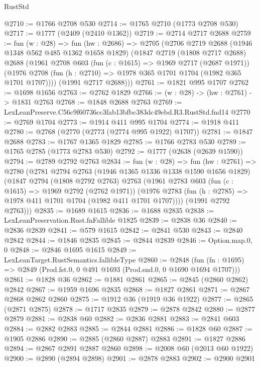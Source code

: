 \begin{lexlean}{RustStd}
\begin{coremodule}
@2710 := @1766 @2708 @530
@2714 := @1765 @2710 (@1773 @2708 @530)
@2717 := @1777 (@2409 (@2410 @1362))
@2719 := @2714 @2717 @2688
@2759 := fun (w : @28) =>
  fun (hw : @2686) =>
  @2705
    (@2706
      @2719
      @2688
      (@1946 @1348 @562 @485 @1362 @1658 @1829)
      (@1847
        @2719
        (@1808 @2717 @2688)
        @2688
        (@1961
          @2708
          @603
          (fun (c : @1615) => @1969 @2717 (@2687 @1971))
          (@1976 @2708 (fun (h : @2710) => @1978 @365 @1701 @1704 (@1982 @365 @1701 @1707))))
        (@1991 @2717 @2688)))
@2761 := @1821 @995 @1707
@2762 := @1698 @1656
@2763 := @2762 @1829
@2766 := (w : @28) -> (hw : @2761) -> @1831 @2763
@2768 := @1848 @2688 @2763
@2769 := LexLeanPreserve.C56c9f60736cc3fab13bfbc383dc49ebd.R3.RustStd.fnd14
@2770 := @2769 @1704
@2773 := @1914 @411 @995 @1704
@2774 := @1918 @411
@2780 := @2768 (@2770 (@2773 (@2774 @995 @1922) @1707))
@2781 := @1847 @2688
@2783 := @1767 @1365 @1829
@2785 := @1766 @2783 @530
@2789 := @1765 @2785 (@1773 @2783 @530)
@2792 := @1777 (@2638 (@2639 @1590))
@2794 := @2789 @2792 @2763
@2834 := fun (w : @28) =>
  fun (hw : @2761) =>
  @2780
    (@2781
      @2794
      @2763
      (@1946 @1365 @1336 @1338 @1590 @1656 @1829)
      (@1847
        @2794
        (@1808 @2792 @2763)
        @2763
        (@1961
          @2783
          @603
          (fun (c : @1615) => @1969 @2792 (@2762 @1971))
          (@1976 @2783 (fun (h : @2785) => @1978 @411 @1701 @1704 (@1982 @411 @1701 @1707))))
        (@1991 @2792 @2763)))
@2835 := @1689 @1615
@2836 := @1688 @2835
@2838 := LexLeanPreservation.Rust.fnFallible @1825
@2839 := @2838 @36
@2840 := @2836 @2839
@2841 := @579 @1615
@2842 := @2841 @530
@2843 := @2840 @2842
@2844 := @1846 @2835
@2845 := @2844 @2839
@2846 := Option.map.{0, 0}
@2848 := @2846 @1695 @1615
@2849 := LexLeanTarget.RustSemantics.fallibleType
@2860 := @2848
    (fun (fn : @1695) => @2849 (Prod.fst.{0, 0} @491 @1693 (Prod.snd.{0, 0} @1690 @1694 @1707)))
@2861 := @1828 @36
@2862 := @1881 @2861
@2865 := @2845 (@2860 @2862) @2842
@2867 := @1959 @1696 @2835
@2868 := @1827 @2861
@2871 := @2867 @2868 @2862 @2860
@2875 := @1912 @36 (@1919 @36 @1922)
@2877 := @2865 (@2871 @2875)
@2878 := @1717 @2835
@2879 := @2878 @2842
@2880 := @2877 @2879
@2881 := @2838 @60
@2882 := @2836 @2881
@2883 := @2841 @603
@2884 := @2882 @2883
@2885 := @2844 @2881
@2886 := @1828 @60
@2887 := @1905 @2886
@2890 := @2885 (@2860 @2887) @2883
@2891 := @1827 @2886
@2894 := @2867 @2891 @2887 @2860
@2898 := @2008 @60 (@2013 @60 @1922)
@2900 := @2890 (@2894 @2898)
@2901 := @2878 @2883
@2902 := @2900 @2901

\end{coremodule}
\end{lexlean}
